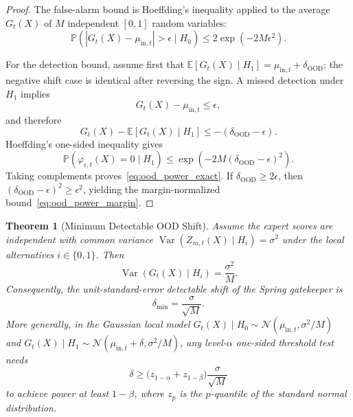 \documentclass[11pt,twocolumn]{article}
\newtheorem{theorem}{Theorem}[section]
\theoremstyle{definition}
\DeclareMathOperator{\Var}{Var}
\newcommand{\E}{\mathbb{E}}
\newcommand{\Pbb}{\mathbb{P}}
\newcommand{\cN}{\mathcal{N}}
\begin{document}
\begin{proof}
\rigorFull
The false-alarm bound is Hoeffding's inequality applied to the average
$G_t(X)$ of $M$ independent $[0,1]$ random variables:
\begin{equation}
  \Pbb\!\left(
  |G_t(X)-\mu_{\mathrm{in},t}|>\epsilon \mid H_0
  \right)
  \le 2\exp(-2M\epsilon^2).
\end{equation}

For the detection bound, assume first that
$\E[G_t(X)\mid H_1]=\mu_{\mathrm{in},t}+\delta_{\mathrm{OOD}}$; the negative
shift case is identical after reversing the sign.  A missed detection under
$H_1$ implies
\begin{equation}
  G_t(X)-\mu_{\mathrm{in},t}\le \epsilon,
\end{equation}
and therefore
\begin{equation}
  G_t(X)-\E[G_t(X)\mid H_1]
  \le
  -(\delta_{\mathrm{OOD}}-\epsilon).
\end{equation}
Hoeffding's one-sided inequality gives
\begin{equation}
  \Pbb(\varphi_{\epsilon,t}(X)=0\mid H_1)
  \le
  \exp\!\left(-2M(\delta_{\mathrm{OOD}}-\epsilon)^2\right).
\end{equation}
Taking complements proves~\eqref{eq:ood_power_exact}.  If
$\delta_{\mathrm{OOD}}\ge 2\epsilon$, then
$(\delta_{\mathrm{OOD}}-\epsilon)^2\ge \epsilon^2$, yielding
the margin-normalized bound~\eqref{eq:ood_power_margin}.
\end{proof}

\begin{theorem}[Minimum Detectable OOD Shift]
\label{thm:spring_ood_min_shift}
Assume the expert scores are independent with common variance
$\Var(Z_{m,t}(X)\mid H_i)=\sigma^2$ under the local alternatives
$i\in\{0,1\}$.  Then
\begin{equation}
  \Var(G_t(X)\mid H_i)=\frac{\sigma^2}{M}.
\end{equation}
Consequently, the unit-standard-error detectable shift of the Spring
gatekeeper is
\begin{equation}
  \delta_{\min}=\frac{\sigma}{\sqrt{M}}.
  \label{eq:ood_delta_min}
\end{equation}
More generally, in the Gaussian local model
$G_t(X)\mid H_0\sim \cN(\mu_{\mathrm{in},t},\sigma^2/M)$ and
$G_t(X)\mid H_1\sim \cN(\mu_{\mathrm{in},t}+\delta,\sigma^2/M)$, any
level-$\alpha$ one-sided threshold test needs
\begin{equation}
  \delta
  \ge
  \bigl(z_{1-\alpha}+z_{1-\beta}\bigr)\frac{\sigma}{\sqrt{M}}
  \label{eq:ood_delta_alpha_beta}
\end{equation}
to achieve power at least $1-\beta$, where $z_p$ is the $p$-quantile of the
standard normal distribution.
\end{theorem}
\end{document}
